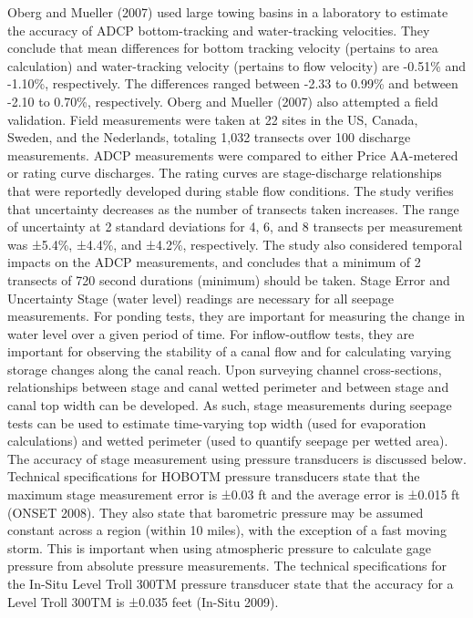 \begin{linenumbers}
Oberg and Mueller (2007) used large towing basins in a laboratory to estimate the accuracy of ADCP bottom-tracking and water-tracking velocities.  They conclude that mean differences for bottom tracking velocity (pertains to area calculation) and water-tracking velocity (pertains to flow velocity) are -0.51\% and -1.10\%, respectively.  The differences ranged between -2.33 to 0.99\% and between -2.10 to 0.70\%, respectively.  Oberg and Mueller (2007) also attempted a field validation.  Field measurements were taken at 22 sites in the US, Canada, Sweden, and the Nederlands, totaling 1,032 transects over 100 discharge measurements.   ADCP measurements were compared to either Price AA-metered or rating curve discharges.  The rating curves are stage-discharge relationships that were reportedly developed during stable flow conditions.  The study verifies that uncertainty decreases as the number of transects taken increases.  The range of uncertainty at 2 standard deviations for 4, 6, and 8 transects per measurement was ±5.4\%, ±4.4\%, and ±4.2\%, respectively.  The study also considered temporal impacts on the ADCP measurements, and concludes that a minimum of 2 transects of 720 second durations (minimum) should be taken.
Stage Error and Uncertainty
Stage (water level) readings are necessary for all seepage measurements.  For ponding tests, they are important for measuring the change in water level over a given period of time.  For inflow-outflow tests, they are important for observing the stability of a canal flow and for calculating varying storage changes along the canal reach.  Upon surveying channel cross-sections, relationships between stage and canal wetted perimeter and between stage and canal top width can be developed.  As such, stage measurements during seepage tests can be used to estimate time-varying top width (used for evaporation calculations) and wetted perimeter (used to quantify seepage per wetted area).  The accuracy of stage measurement using pressure transducers is discussed below.
Technical specifications for HOBOTM pressure transducers state that the maximum stage measurement error is ±0.03 ft and the average error is ±0.015 ft (ONSET 2008).  They also state that barometric pressure may be assumed constant across a region (within 10 miles), with the exception of a fast moving storm.  This is important when using atmospheric pressure to calculate gage pressure from absolute pressure measurements.
The technical specifications for the In-Situ Level Troll 300TM pressure transducer state that the accuracy for a Level Troll 300TM is ±0.035 feet (In-Situ 2009).

\end{linenumbers}
